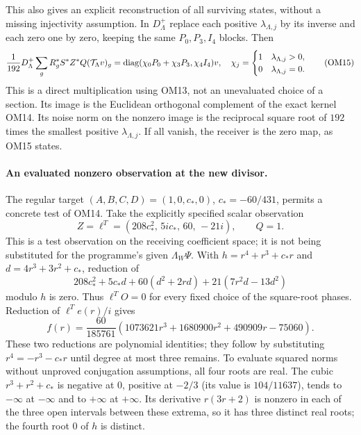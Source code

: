 \documentclass[11pt]{article}
\begin{document}
This also gives an explicit reconstruction of all surviving states,
without a missing injectivity assumption.  In $D_{\Lambda}^{+}$
replace each positive $\lambda_{\Lambda,j}$ by its inverse and each
zero one by zero, keeping the same $P_0,P_3,I_4$ blocks.  Then
\[
\frac1{192}D_\Lambda^+
\sum_gR_g^*S^*Z^*Q(\mathcal T_\Lambda v)_g
=\operatorname{diag}(\chi_0P_0+\chi_3P_3,\chi_4I_4)v,
\quad
\chi_j=\begin{cases}1&\lambda_{\Lambda,j}>0,\\0&\lambda_{\Lambda,j}=0.
\end{cases}
\tag{OM15}
\]
This is a direct multiplication using OM13, not an unevaluated
choice of a section.  Its image is the Euclidean orthogonal
complement of the exact kernel OM14.  Its noise norm on the
nonzero image is the reciprocal square root of $192$ times the
smallest positive $\lambda_{\Lambda,j}$.  If all vanish, the
receiver is the zero map, as OM15 states.

\paragraph{An evaluated nonzero observation at the new divisor.}
The regular target $(A,B,C,D)=(1,0,c_*,0)$, $c_*=-60/431$, permits
a concrete test of OM14.  Take the explicitly specified scalar
observation
\[
Z=\ell^T=(208c_*^2,\,5ic_*,\,60,\,-21i),\qquad Q=1.
\tag{OM16}
\]
This is a test observation on the receiving coefficient space;
it is not being substituted for the programme's given $\Lambda_W\Psi$.
With $h=r^4+r^3+c_*r$ and $d=4r^3+3r^2+c_*$, reduction of
\[
208c_*^2+5c_*d+60(d^2+2rd)+21(7r^2d-13d^2)
\]
modulo $h$ is zero.  Thus $\ell^TO=0$ for every fixed choice of
the square-root phases.  Reduction of $\ell^T e(r)/i$ gives
\[
f(r)=\frac{60}{185761}
 (1073621r^3+1680900r^2+490909r-75060).
\tag{OM17}
\]
These two reductions are polynomial identities; they follow by
substituting $r^4=-r^3-c_*r$ until degree at most three remains.
To evaluate squared norms without unproved conjugation assumptions,
all four roots are real.  The cubic $r^3+r^2+c_*$ is negative at
$0$, positive at $-2/3$ (its value is $104/11637$), tends to
$-\infty$ at $-\infty$ and to $+\infty$ at $+\infty$.
Its derivative $r(3r+2)$ is nonzero in each of the three open
intervals between these extrema, so it has three distinct real
roots; the fourth root $0$ of $h$ is distinct.
\end{document}
